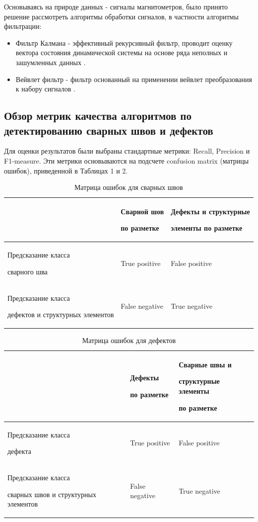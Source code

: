 \documentclass[a4paper,article,14pt]{extarticle}
\begin{document}
Основываясь на природе данных - сигналы магнитометров, было принято решение рассмотреть алгоритмы  обработки сигналов, в частности алгоритмы фильтрации:

\begin{itemize}
    \item Фильтр Калмана - эффективный рекурсивный фильтр, проводит оценку вектора состояния динамической системы 
    на основе ряда неполных и зашумленных данных \cite{a11}.
    \item Вейвлет фильтр - фильтр основанный на применении вейвлет преобразования к набору сигналов \cite{a12}.
\end{itemize}

\subsection{Обзор метрик качества алгоритмов по детектированию сварных швов и дефектов}
Для оценки результатов были выбраны стандартные метрики: Recall,  Precision и F1-measure.
Эти метрики основываются на подсчете confusion matrix (матрицы ошибок), приведенной в Таблицах 1 и 2.

\begin{center}
\begin{longtable}{|p{5cm}|p{5cm}|p{6cm}|}
    \caption{Матрица ошибок для сварных швов}\\\hline
     & Сварной шов \par по разметке & Дефекты и структурные \par элементы по разметке \\ \hline
    Предсказание класса\par сварного шва & True positive & False positive \\ \hline
    Предсказание класса \par дефектов и структурных элементов & False negative & True negative \\ \hline
\end{longtable}
\end{center}

\begin{center}
\begin{longtable}{|p{5cm}|p{5cm}|p{6cm}|}
    \caption{Матрица ошибок для дефектов}\\\hline
        & Дефекты \par по разметке & Сварные швы и \par структурные элементы \par по разметке \\ \hline
    Предсказание класса\par дефекта & True positive & False positive \\ \hline
    Предсказание класса \par сварных швов и структурных элементов & False negative & True negative \\ \hline
\end{longtable}
\end{center}
\end{document}
